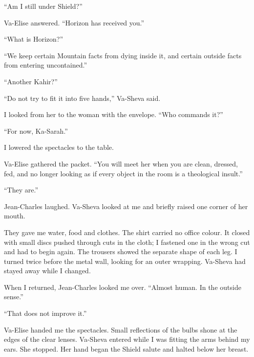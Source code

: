 ``Am I still under Shield?''\par

Va-Elise answered. ``Horizon has received you.''\par

``What is Horizon?''\par

``We keep certain Mountain facts from dying inside it, and certain outside facts from entering uncontained.''\par

``Another Kahir?''\par

``Do not try to fit it into five hands,'' Va-Sheva said.\par

I looked from her to the woman with the envelope. ``Who commands it?''\par

``For now, Ka-Sarah.''\par

I lowered the spectacles to the table.\par

Va-Elise gathered the packet. ``You will meet her when you are clean, dressed, fed, and no longer looking as if every object in the room is a theological insult.''\par

``They are.''\par

Jean-Charles laughed. Va-Sheva looked at me and briefly raised one corner of her mouth.\par

\ornament

They gave me water, food and clothes. The shirt carried no office colour. It closed with small discs pushed through cuts in the cloth; I fastened one in the wrong cut and had to begin again. The trousers showed the separate shape of each leg. I turned twice before the metal wall, looking for an outer wrapping. Va-Sheva had stayed away while I changed.\par

When I returned, Jean-Charles looked me over. ``Almost human. In the outside sense.''\par

``That does not improve it.''\par

Va-Elise handed me the spectacles. Small reflections of the bulbs shone at the edges of the clear lenses. Va-Sheva entered while I was fitting the arms behind my ears. She stopped. Her hand began the Shield salute and halted below her breast.\par

